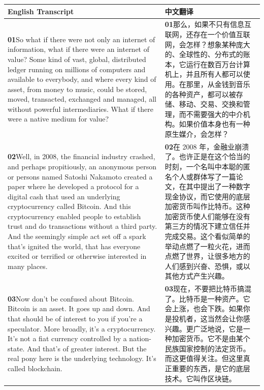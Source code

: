 \documentclass[UTF8,zihao=-4,fontset=fandol]{ctexart}
\newcommand{\TranscriptColumn}{\raggedright\arraybackslash\hyphenpenalty=10000\exhyphenpenalty=10000\sloppy}
\begin{document}
\renewcommand{\arraystretch}{1.23}
\begin{longtable}{>{\TranscriptColumn}p{} >{\TranscriptColumn}p{}}
\rowcolor{headerBg}\textbf{English Transcript} & \textbf{中文翻译} \\ \hline
\textbf{01}\quad So what if there were not only an internet of information, what if there were an internet of value? Some kind of vast, global, distributed ledger running on millions of computers and available to everybody, and where every kind of asset, from money to music, could be stored, moved, transacted, exchanged and managed, all without powerful intermediaries. What if there were a native medium for value? & \textbf{01}\quad 那么，如果不只有信息互联网，还存在一个价值互联网，会怎样？想象某种庞大的、全球性的、分布式的账本，它运行在数百万台计算机上，并且所有人都可以使用。在那里，从金钱到音乐的各种资产，都可以被存储、移动、交易、交换和管理，而不需要强大的中介机构。如果价值本身也有一种原生媒介，会怎样？ \\ \hline
\textbf{02}\quad Well, in 2008, the financial industry crashed, and perhaps propitiously, an anonymous person or persons named Satoshi Nakamoto created a paper where he developed a protocol for a digital cash that used an underlying cryptocurrency called Bitcoin. And this cryptocurrency enabled people to establish trust and do transactions without a third party. And the seemingly simple act set off a spark that's ignited the world, that has everyone excited or terrified or otherwise interested in many places. & \textbf{02}\quad 在 2008 年，金融业崩溃了。也许正是在这个恰当的时刻，一个名叫中本聪的匿名个人或群体写了一篇论文，在其中提出了一种数字现金协议，而它使用的底层加密货币叫作比特币。这种加密货币使人们能够在没有第三方的情况下建立信任并完成交易。这个看似简单的举动点燃了一粒火花，进而点燃了世界，让很多地方的人们感到兴奋、恐惧，或以其他方式产生兴趣。 \\ \hline
\textbf{03}\quad Now don't be confused about Bitcoin. Bitcoin is an asset. It goes up and down. And that should be of interest to you if you're a speculator. More broadly, it's a cryptocurrency. It's not a fiat currency controlled by a nation-state. And that's of greater interest. But the real pony here is the underlying technology. It's called blockchain. & \textbf{03}\quad 现在，不要把比特币搞混了。比特币是一种资产。它会上涨，也会下跌。如果你是投机者，这当然会让你感兴趣。更广泛地说，它是一种加密货币。它不是由某个民族国家控制的法定货币。而这更值得关注。但这里真正重要的东西，是它的底层技术。它叫作区块链。 \\ \hline

\end{longtable}
\end{document}
